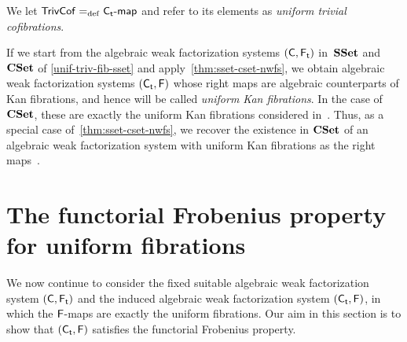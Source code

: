 \documentclass[reqno,10pt,a4paper,oneside,draft]{amsart}
\begin{document}
{{We let $\mathsf{TrivCof} =_{\operatorname{def}} {\mathsf{C_t}}\text{-}\mathsf{map}$ and refer to its elements as \emph{uniform trivial cofibrations}. 




\begin{example} \label{unif-fib-sset} If we start from the algebraic weak factorization systems $(\mathsf{C}, \mathsf{F_t})$ in~$\mathbf{SSet}$ and~$\mathbf{CSet}$ of \cref{unif-triv-fib-sset}
and apply~\cref{thm:sset-cset-nwfs}, we obtain algebraic weak factorization systems $(\mathsf{C_t}, \mathsf{F})$ whose right maps are algebraic counterparts of Kan fibrations,
and hence will be called \emph{uniform Kan fibrations}. In the case of $\mathbf{CSet}$, these are  exactly the uniform Kan fibrations considered in~\cite{cohen-et-al:cubicaltt}. 
Thus,  as a special case of~\cref{thm:sset-cset-nwfs}, we recover the existence in $\mathbf{CSet}$ of an algebraic weak factorization system with uniform Kan fibrations as the right 
maps~\cite{cohen-et-al:cubicaltt,swan-awfs}.
\end{example} 




\section{The functorial Frobenius property for uniform fibrations}
\label{sec:frocuf}


We now continue to consider the fixed suitable algebraic weak factorization system $(\mathsf{C}, \mathsf{F_t})$ and the induced 
algebraic weak factorization system $(\mathsf{C_t}, \mathsf{F})$, in which the $\mathsf{F}$-maps are exactly the
uniform fibrations. Our aim in this section is to show that $(\mathsf{C_t}, \mathsf{F})$ satisfies the functorial
Frobenius property. 

}}
\end{document}
